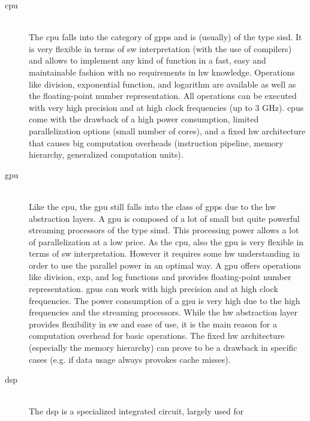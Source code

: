 \documentclass[mscthesis]{usiinfthesis}
\begin{document}
\begin{description}
    \item[\acrshort{cpu}] \hfill \\
        The \acrfull{cpu} falls into the category of \glspl{gpp} and is
        (usually) of the type \gls{sisd}. It is very flexible in terms of
        \gls{sw} interpretation (with the use of compilers) and allows to
        implement any kind of function in a fast, easy and maintainable fashion
        with no requirements in \gls{hw} knowledge. Operations like division,
        exponential function, and logarithm are available as well as the
        floating-point number representation. All operations can be executed
        with very high precision and at high clock frequencies (up to 3 GHz).
        \glspl{cpu} come with the drawback of a high power consumption, limited
        parallelization options (small number of cores), and a fixed \gls{hw}
        architecture that causes big computation overheads (instruction
        pipeline, memory hierarchy, generalized computation units).
    \item[\acrshort{gpu}] \hfill \\
        Like the \gls{cpu}, the \acrfull{gpu} still falls into the class of
        \glspl{gpp} due to the \gls{hw} abstraction layers. A \gls{gpu} is
        composed of a lot of small but quite powerful streaming processors of
        the type \gls{simd}. This processing power allows a lot of
        parallelization at a low price. As the \gls{cpu}, also the \gls{gpu} is
        very flexible in terms of \gls{sw} interpretation. However it requires
        some \gls{hw} understanding in order to use the parallel power in an
        optimal way. A \gls{gpu} offers operations like division, exp, and log
        functions and provides floating-point number representation.
        \glspl{gpu} can work with high precision and at high clock frequencies.
        The power consumption of a \gls{gpu} is very high due to the high
        frequencies and the streaming processors. While the \gls{hw}
        abstraction layer provides flexibility in \gls{sw} and ease of use, it
        is the main reason for a computation overhead for basic operations. The
        fixed \gls{hw} architecture (especially the memory hierarchy) can prove
        to be a drawback in specific cases (e.g. if data usage always provokes
        cache misses).
    \item[\acrshort{dsp}] \hfill \\
        The \acrfull{dsp} is a specialized integrated circuit, largely used for

\end{description}
\end{document}
